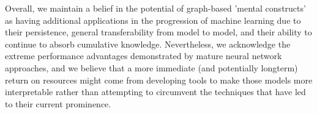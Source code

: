 \documentclass[11pt,a4paper]{article}
\begin{document}
Overall, we maintain a belief in the potential of graph-based 'mental constructs' as having additional applications in the progression of machine learning due to their persistence, general transferability from model to model, and their ability to continue to absorb cumulative knowledge. Nevertheless, we acknowledge the extreme performance advantages demonstrated by mature neural network approaches, and we believe that a more immediate (and potentially longterm) return on resources might come from developing tools to make those models more interpretable rather than attempting to circumvent the techniques that have led to their current prominence.



\end{document}
